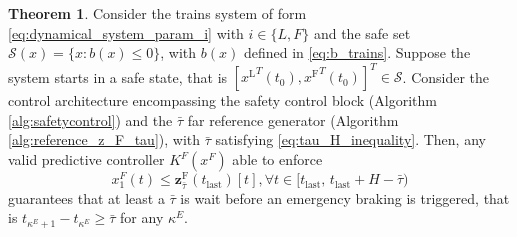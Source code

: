 \documentclass[letterpaper, 10 pt, conference]{ieeeconf}
\theoremstyle{definition}
\theoremstyle{nopoint}
\newtheorem{theorem}{Theorem}[section]
\newcounter{Theorem}
\begin{document}
\begin{theorem}\label{thm:tau_far_control}
Consider the trains system of form \eqref{eq:dynamical_system_param_i} with $i\in\{L,F\}$ and the safe set $\mathcal{S}(x)=\{x: b(x)\leq 0\}$, with $b(x)$ defined in \eqref{eq:b_trains}. 
Suppose the system starts in a safe state, that is $[{x^\mathrm{L}}^T(t_0),{x^\mathrm{F}}^T(t_0)]^T\in\mathcal{S}$. Consider the control architecture encompassing  the safety control block (Algorithm \ref{alg:safetycontrol}) and the $\bar{\tau}$ far reference generator (Algorithm \ref{alg:reference_z_F_tau}), with $\bar{\tau}$ satisfying \eqref{eq:tau_H_inequality}. Then, any valid predictive controller $K^F(x^F)$ able to enforce
\begin{equation}\label{eq:tau_far_constraint}
x_1^F(t)\leq  \mathbf{z}_{\bar{\tau}}^\mathrm{F}(t_{\mathrm{last}})[t], \forall t \in [t_{\mathrm{last}}, \, t_{\mathrm{last}}+H-\bar{\tau})
\end{equation} 
guarantees that at least a $\bar{\tau}$ is wait before an emergency braking is triggered, that is
$ t_{\kappa^E +1} -t_{\kappa^E}\geq \bar{\tau}$ for any  $\kappa^E$.

\end{theorem}
 
\end{document}
